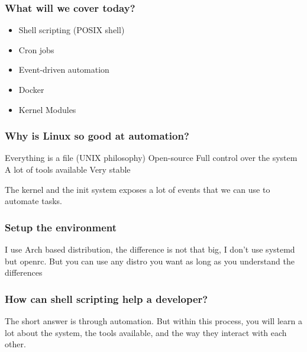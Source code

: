 \documentclass{beamer}
\begin{document}
\begin{frame}
\frametitle{What will we cover today?}
\begin{itemize}
    \small
    \item Shell scripting (POSIX shell) \pause
    \item Cron jobs\pause
    \item Event-driven automation\pause
    \item Docker\pause
    \item Kernel Modules
\end{itemize}

\end{frame}

\begin{frame}
\frametitle{Why is Linux so good at automation?}
\small
    Everything is a file (UNIX philosophy) \newline
    Open-source \newline
    Full control over the system \newline
    A lot of tools available \newline
    Very stable \newline

    The kernel and the init system exposes a lot of events that we can use to
    automate tasks.

\end{frame}

\begin{frame}
\frametitle{Setup the environment}
\small
    I use Arch based distribution, the difference is not that big, I don't use
    systemd but openrc. \newline
    But you can use any distro you want as long as you understand the differences

\end{frame}

\begin{frame}
\frametitle{How can shell scripting help a developer?}
\small
    The short answer is through automation. \newline \newline
    But within this process, you will learn a lot about the system, the tools
    available, and the way they interact with each other. \newline

\end{frame}

\end{document}
